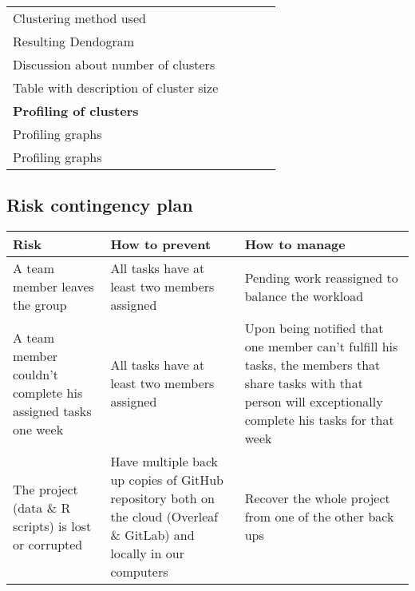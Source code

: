 \begin{table}[H]
\begin{tabular}{@{}l|c|c|c|c@{}}
Clustering method used                          &    &    &    &    \\
Resulting Dendogram                             &    &    &    &    \\
Discussion about number of clusters             &    &    &    &    \\
Table with description of cluster size          &    &    &    &    \\ \midrule
\textbf{Profiling of clusters}                  &    &    &    &    \\
Profiling graphs                                &    &    &    &    \\
Profiling graphs                                &    &    &    &    \\ \bottomrule
\end{tabular}
\end{table}

\subsection{Risk contingency plan}%
\label{sub:risk_contingency_plan}


\begin{table}[H]
\centering
\begin{tabular}{@{}p{5cm}p{5cm}p{5cm}@{}}
\toprule
Risk & How to prevent & How to manage \\ \midrule
A team member leaves the group & All tasks have at least two members assigned & Pending work reassigned to balance the workload\\
\addlinespace[0.5em]
A team member couldn't complete his assigned tasks one week & All tasks have at least two members assigned & Upon being notified that one member can't fulfill his tasks, the members that share tasks with that person will exceptionally complete his tasks for that week\\
\addlinespace[0.5em]
The project (data \& R scripts) is lost or corrupted & Have multiple back up copies of GitHub repository both on the cloud (Overleaf \& GitLab) and locally in our computers & Recover the whole project from one of the other back ups\\
\bottomrule
\end{tabular}
\end{table}

